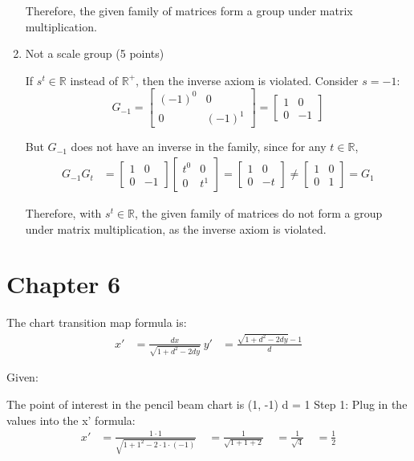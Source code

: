 \documentclass{article}
\begin{document}
\begin{enumerate}
Therefore, the given family of matrices form a group under matrix multiplication.

\item Not a scale group (5 points)

If $s^t \in \mathbb{R}$ instead of $\mathbb{R}^+$, then the inverse axiom is violated. Consider $s = -1$:
\[G_{-1} = \begin{bmatrix} (-1)^0 & 0 \\ 0 & (-1)^1 \end{bmatrix} = \begin{bmatrix} 1 & 0 \\ 0 & -1 \end{bmatrix}\]

But $G_{-1}$ does not have an inverse in the family, since for any $t \in \mathbb{R}$, 
\begin{align*}
G_{-1} G_t &= \begin{bmatrix} 1 & 0 \\ 0 & -1 \end{bmatrix} \begin{bmatrix} t^0 & 0 \\ 0 & t^1 \end{bmatrix} = \begin{bmatrix} 1 & 0 \\ 0 & -t \end{bmatrix} \neq \begin{bmatrix} 1 & 0 \\ 0 & 1 \end{bmatrix} = G_1
\end{align*}

Therefore, with $s^t \in \mathbb{R}$, the given family of matrices do not form a group under matrix multiplication, as the inverse axiom is violated.
\end{enumerate}

\newpage
\section{Chapter 6}

The chart transition map formula is:
\begin{align*}
x' &= \frac{dx}{\sqrt{1+d^2-2dy}} \
y' &= \frac{\sqrt{1+d^2-2dy}-1}{d}
\end{align*}

Given:

The point of interest in the pencil beam chart is (1, -1)
d = 1
Step 1: Plug in the values into the x' formula:
\begin{align*}
x' &= \frac{1 \cdot 1}{\sqrt{1+1^2-2 \cdot 1 \cdot (-1)}} \
&= \frac{1}{\sqrt{1+1+2}} \
&= \frac{1}{\sqrt{4}} \
&= \frac{1}{2}
\end{align*}
\end{document}
